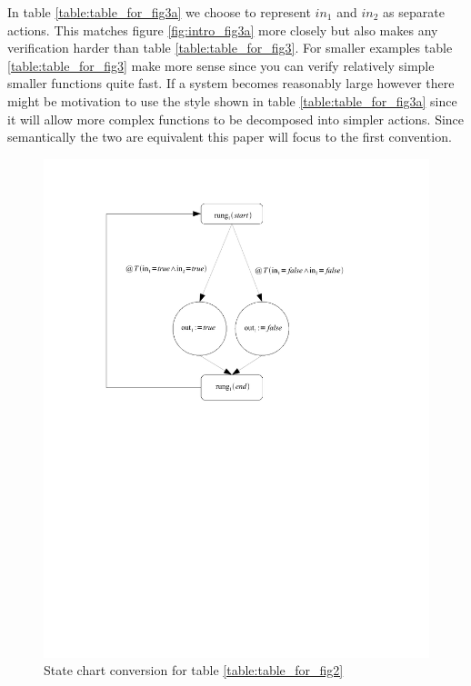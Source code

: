 In table \ref{table:table_for_fig3a} we choose to represent $in_1$ and $in_2$ as separate actions. This matches figure
\ref{fig:intro_fig3a} more closely but also makes any verification harder than table \ref{table:table_for_fig3}. For
smaller examples table \ref{table:table_for_fig3} make more sense since you can verify relatively simple smaller functions
quite fast. If a system becomes reasonably large however there might be motivation to use the style shown in 
table \ref{table:table_for_fig3a} since it will allow more complex functions to be decomposed into simpler actions.
Since semantically the two are equivalent this paper will focus to the first convention.




\pagebreak[4]

\begin{figure}[htp]
    \centering
    \includegraphics[trim= 0 140mm 40mm 10mm, clip, width=\imgmed]{./images/intro_and_graph.pdf} %
    \caption{State chart conversion for table \ref{table:table_for_fig2}}
    \label{fig:intro_and_graph}
\end{figure}

